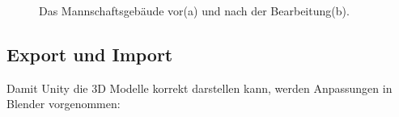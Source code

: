 \begin{figure}[hbt!]
    \centering
    \qquad
    \caption{Das Mannschaftsgebäude vor(a) und nach der Bearbeitung(b).}%
    \label{fig:blender_vergleich}
\end{figure}

\subsection{Export und Import}
Damit Unity die 3D Modelle korrekt darstellen kann, werden Anpassungen in Blender vorgenommen:


